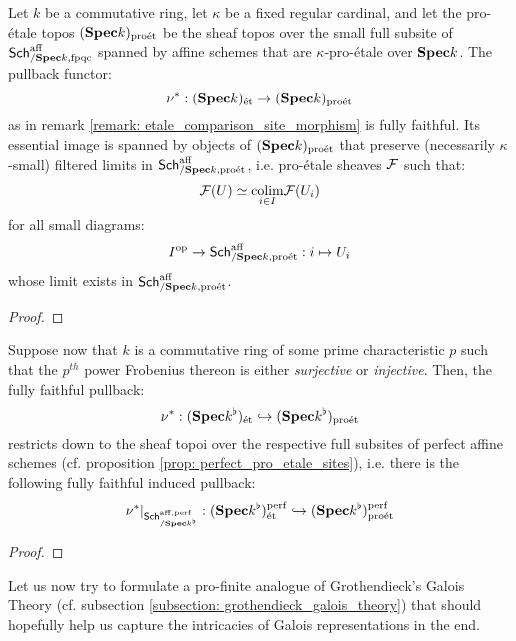                     \begin{proposition}
                        Let $k$ be a commutative ring, let $\kappa$ be a fixed regular cardinal, and let the pro-\'etale topos $(\mathbf{Spec} k)_{\mathrm{pro\acute{e}t}}$ be the sheaf topos over the small full subsite of $\mathsf{Sch}^{\mathrm{aff}}_{/\mathbf{Spec} k, \mathrm{fpqc}}$ spanned by affine schemes that are $\kappa$-pro-\'etale over $\mathbf{Spec} k$. The pullback functor:
                            $$\nu^*: (\mathbf{Spec} k)_{\mathrm{\acute{e}t}} \to (\mathbf{Spec} k)_{\mathrm{pro\acute{e}t}}$$
                        as in remark \ref{remark: etale_comparison_site_morphism} is fully faithful. Its essential image is spanned by objects of $(\mathbf{Spec} k)_{\mathrm{pro\acute{e}t}}$ that preserve (necessarily $\kappa$-small) filtered limits in $\mathsf{Sch}^{\mathrm{aff}}_{/\mathbf{Spec} k, \mathrm{pro\acute{e}t}}$, i.e. pro-\'etale sheaves $\mathcal{F}$ such that:
                            $$\mathcal{F}(U) \simeq \underset{i \in I}{\operatorname{colim}} \mathcal{F}(U_i)$$
                        for all small diagrams:
                            $$I^{\mathrm{op}} \to \mathsf{Sch}^{\mathrm{aff}}_{/\mathbf{Spec} k, \mathrm{pro\acute{e}t}}: i \mapsto U_i$$
                        whose limit exists in $\mathsf{Sch}^{\mathrm{aff}}_{/\mathbf{Spec} k, \mathrm{pro\acute{e}t}}$. 
                    \end{proposition}
                        \begin{proof}
                            
                        \end{proof}
                    \begin{corollary}
                        Suppose now that $k$ is a commutative ring of some prime characteristic $p$ such that the $p^{th}$ power Frobenius thereon is either \textit{surjective} or \textit{injective}. Then, the fully faithful pullback:
                            $$\nu^*: (\mathbf{Spec} k^{\flat})_{\mathrm{\acute{e}t}} \hookrightarrow (\mathbf{Spec} k^{\flat})_{\mathrm{pro\acute{e}t}}$$
                        restricts down to the sheaf topoi over the respective full subsites of perfect affine schemes (cf. proposition \ref{prop: perfect_pro_etale_sites}), i.e. there is the following fully faithful induced pullback:
                            $$\nu^*|_{\mathsf{Sch}^{\mathrm{aff}, \mathrm{perf}}_{/\mathbf{Spec} k^{\flat}}}: (\mathbf{Spec} k^{\flat})^{\mathrm{perf}}_{\mathrm{\acute{e}t}} \hookrightarrow (\mathbf{Spec} k^{\flat})^{\mathrm{perf}}_{\mathrm{pro\acute{e}t}}$$
                    \end{corollary}
                        \begin{proof}
                            
                        \end{proof}
                    
                    Let us now try to formulate a pro-finite analogue of Grothendieck's Galois Theory (cf. subsection \ref{subsection: grothendieck_galois_theory}) that should hopefully help us capture the intricacies of Galois representations in the end.
                    
